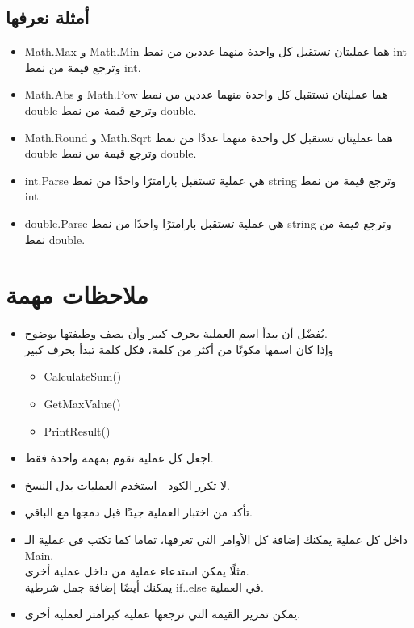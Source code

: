 \documentclass[12pt]{article}
\begin{document}
\subsection*{أمثلة نعرفها}
\begin{itemize}
    \item \textenglish{Math.Max} و \textenglish{Math.Min} هما عمليتان تستقبل كل واحدة منهما عددين من نمط \textenglish{int} وترجع قيمة من نمط \textenglish{int}.
    \item \textenglish{Math.Abs} و \textenglish{Math.Pow} هما عمليتان تستقبل كل واحدة منهما عددين من نمط \textenglish{double} وترجع قيمة من نمط \textenglish{double}.
    \item \textenglish{Math.Round} و \textenglish{Math.Sqrt} هما عمليتان تستقبل كل واحدة منهما عددًا من نمط \textenglish{double} وترجع قيمة من نمط \textenglish{double}.
    \item \textenglish{int.Parse} هي عملية تستقبل بارامترًا واحدًا من نمط \textenglish{string} وترجع قيمة من نمط \textenglish{int}.
    \item \textenglish{double.Parse} هي عملية تستقبل بارامترًا واحدًا من نمط \textenglish{string} وترجع قيمة من نمط \textenglish{double}.
\end{itemize}

\section{ملاحظات مهمة}

\begin{itemize}
\item
    يُفضّل أن يبدأ اسم العملية بحرف كبير وأن يصف وظيفتها بوضوح. \\
وإذا كان اسمها مكونًا من أكثر من كلمة، فكل كلمة تبدأ بحرف كبير
\begin{itemize}
    \item \textenglish{CalculateSum()}
    \item \textenglish{GetMaxValue()}
    \item \textenglish{PrintResult()}
\end{itemize}

\item اجعل كل عملية تقوم بمهمة واحدة فقط.
\item لا تكرر الكود - استخدم العمليات بدل النسخ.
\item تأكد من اختبار العملية جيدًا قبل دمجها مع الباقي.
\item داخل كل عملية يمكنك إضافة كل الأوامر التي تعرفها، تماما كما تكتب في عملية الـ \textenglish{Main}. \\
مثلًا يمكن استدعاء عملية من داخل عملية أخرى. \\
يمكنك أيضًا إضافة جمل شرطية \textenglish{if..else} في العملية.
\item يمكن تمرير القيمة التي ترجعها عملية كبرامتر لعملية أخرى.

\end{itemize}
\end{document}
